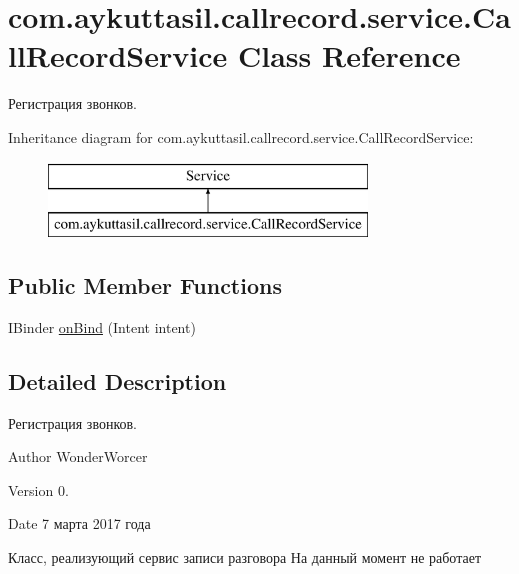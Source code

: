 \hypertarget{classcom_1_1aykuttasil_1_1callrecord_1_1service_1_1_call_record_service}{}\section{com.\+aykuttasil.\+callrecord.\+service.\+Call\+Record\+Service Class Reference}
\label{classcom_1_1aykuttasil_1_1callrecord_1_1service_1_1_call_record_service}


Регистрация звонков.  


Inheritance diagram for com.\+aykuttasil.\+callrecord.\+service.\+Call\+Record\+Service\+:\begin{figure}[H]
\begin{center}
\leavevmode
\includegraphics[height=2.000000cm]{classcom_1_1aykuttasil_1_1callrecord_1_1service_1_1_call_record_service}
\end{center}
\end{figure}
\subsection*{Public Member Functions}
\begin{DoxyCompactItemize}
\item 
I\+Binder \hyperlink{classcom_1_1aykuttasil_1_1callrecord_1_1service_1_1_call_record_service_a9093beaceb138056c7cb92d9dbe67bc4}{on\+Bind} (Intent intent)
\end{DoxyCompactItemize}


\subsection{Detailed Description}
Регистрация звонков. 

\begin{DoxyAuthor}{Author}
Wonder\+Worcer 
\end{DoxyAuthor}
\begin{DoxyVersion}{Version}
0. 
\end{DoxyVersion}
\begin{DoxyDate}{Date}
7 марта 2017 года
\end{DoxyDate}
Класс, реализующий сервис записи разговора На данный момент не работает 

